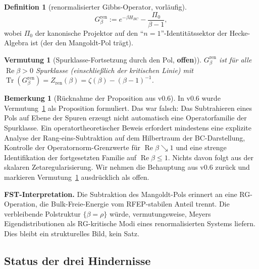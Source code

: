 \documentclass[11pt,a4paper]{article}
\theoremstyle{plain}
\newtheorem{conjecture}[theorem]{Vermutung}
\theoremstyle{definition}
\newtheorem{definition}[theorem]{Definition}
\newtheorem{remark}[theorem]{Bemerkung}
\DeclareMathOperator{\Tr}{Tr}
\renewcommand{\Re}{\operatorname{Re}}
\begin{document}
\begin{definition}[renormalisierter Gibbs-Operator, vorläufig]
\label{def:ren-gibbs}
\[
  G_\beta^{\mathrm{ren}} := e^{-\beta H_{BC}}
    - \frac{\Pi_0}{\beta - 1},
\]
wobei $\Pi_0$ der kanonische Projektor auf den
``$n = 1$''-Identitätssektor der Hecke-Algebra ist (der den
Mangoldt-Pol trägt).
\end{definition}

\begin{conjecture}[Spurklasse-Fortsetzung durch den Pol,
\textbf{offen})]
\label{conj:ren-trace-class}
$G_\beta^{\mathrm{ren}}$ ist für alle $\Re\beta > 0$ Spurklasse
(einschließlich der kritischen Linie) mit
$\Tr(G_\beta^{\mathrm{ren}}) = Z_{\mathrm{ren}}(\beta) = \zeta(\beta)
- (\beta - 1)^{-1}$.
\end{conjecture}

\begin{remark}[Rücknahme der Proposition aus v0.6]
\label{rem:o3-retraction}
In v0.6 wurde Vermutung~\ref{conj:ren-trace-class} als Proposition
formuliert. Das war falsch: Das Subtrahieren eines Pols auf Ebene der
Spuren erzeugt nicht automatisch eine Operatorfamilie der Spurklasse.
Ein operatortheoretischer Beweis erfordert mindestens eine explizite
Analyse der Rang-eins-Subtraktion auf dem Hilbertraum der BC-Darstellung,
Kontrolle der Operatornorm-Grenzwerte für $\Re\beta \searrow 1$ und eine
strenge Identifikation der fortgesetzten Familie auf $\Re\beta \le 1$.
Nichts davon folgt aus der skalaren Zetaregularisierung. Wir nehmen die
Behauptung aus v0.6 zurück und markieren Vermutung~\ref{conj:ren-trace-class}
ausdrücklich als offen.
\end{remark}

\textbf{FST-Interpretation.} Die Subtraktion des Mangoldt-Pols erinnert
an eine RG-Operation, die Bulk-Freie-Energie vom RFEP-stabilen Anteil
trennt. Die verbleibende Polstruktur $\{\beta = \rho\}$ würde, vermutungsweise,
Meyers Eigendistributionen als RG-kritische Modi eines renormalisierten
Systems liefern. Dies bleibt ein strukturelles Bild, kein Satz.

\subsection{Status der drei Hindernisse}
\end{document}
